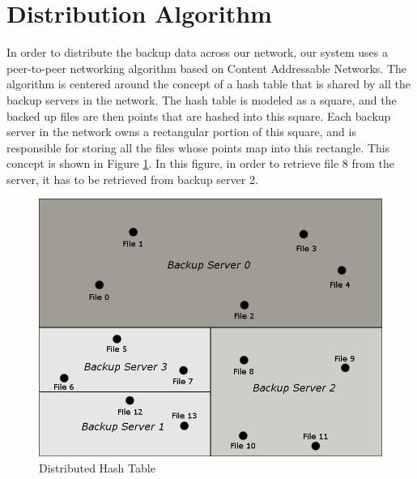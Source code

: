 %

\section{Distribution Algorithm}

In order to distribute the backup data across our network, our system uses a
peer-to-peer networking algorithm based on Content Addressable Networks. \cite{scalable}
The algorithm is centered around the concept of a hash table that is shared by all the backup
servers in the network. The hash table is modeled as a square, and the backed up files are then
points that are hashed into this square. Each backup server in the network owns a rectangular portion
of this square, and is responsible for storing all the files whose points map into this rectangle.
This concept is shown in Figure \ref{fig:dht_1}. In this figure, in order to retrieve file 8 from the server,
it has to be retrieved from backup server 2.

\begin{figure}[hb]
\centering
\includegraphics[scale=0.5]{images/dht_basic.png}
\caption{Distributed Hash Table}
\label{fig:dht_1}
\end{figure}

